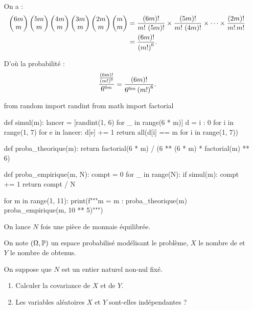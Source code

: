 \begin{corr}[Exercice 2, 2]
On a : \[\begin{aligned}
\binom{m}{6m}\binom{m}{5m}\binom{m}{4m}\binom{m}{3m}\binom{m}{2m}\binom{m}{m}&=\dfrac{\paren{6m}!}{m!\,\paren{5m}!}\times\dfrac{\paren{5m}!}{m!\,\paren{4m}!}\times\dots\times\dfrac{\paren{2m}!}{m!\,m!} \\
&=\dfrac{\paren{6m}!}{\paren{m!}^6}.
\end{aligned}\]

D'où la probabilité : \[\dfrac{\frac{\paren{6m}!}{\paren{m!}^6}}{6^{6m}}=\dfrac{\paren{6m}!}{6^{6m}\paren{m!}^6}.\]
\end{corr}

\begin{corr}[Exercice 2, 3]
\begin{code}
from random import randint
from math import factorial

def simul(m):
    lancer = [randint(1, 6) for _ in range(6 * m)]
    d = {i : 0 for i in range(1, 7)}
    for e in lancer:
        d[e] += 1
    return all(d[i] == m for i in range(1, 7))

def proba_theorique(m):
    return factorial(6 * m) / (6 ** (6 * m) * factorial(m) ** 6)

def proba_empirique(m, N):
    compt = 0
    for _ in range(N):
        if simul(m):
            compt += 1
    return compt / N

for m in range(1, 11):
    print(f"""m = {m} :
{proba_theorique(m)}
{proba_empirique(m, 10 ** 5)}""")
\end{code}
\end{corr}

\begin{exo}
On lance \(N\) fois une pièce de monnaie équilibrée.

On note \(\groupe{\Omega}[\prem]\) un espace probabilisé modélisant le problème, \(X\) le nombre de  et \(Y\) le nombre de  obtenus.

On suppose que \(N\) est un entier naturel non-nul fixé.

\begin{enumerate}
    \item Calculer la covariance de \(X\) et de \(Y\). \\
    \item Les variables aléatoires \(X\) et \(Y\) sont-elles indépendantes ? \\
\end{enumerate}
\end{exo}

